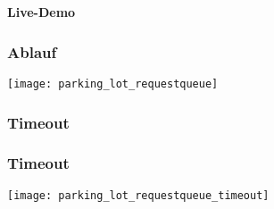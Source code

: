 \documentclass[ngerman]{presentation}
\begin{document}

\section*{}
\begin{frame}
\centering\huge\textbf{Live-Demo}
\end{frame}

\begin{frame}[c,label=ablauf]
    \frametitle{Ablauf}

    \vspace{-0.6cm}
    \begin{center}
    \texttt{[image: parking\_lot\_requestqueue]}
    \end{center}
\end{frame}

\subsubsection{Timeout}
\label{sec:timeout}

\begin{frame}[c,label=timeout]
    \frametitle{Timeout}

    \vspace{-0.6cm}
    \begin{center}
    \texttt{[image: parking\_lot\_requestqueue\_timeout]}
    \end{center}
\end{frame}
\end{document}
